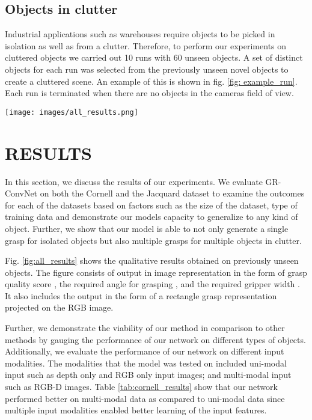 \documentclass[letterpaper, 10pt, conference]{IEEEtran}
\begin{document}
\subsection{Objects in clutter}
Industrial applications such as warehouses require objects to be picked in isolation as well as from a clutter. Therefore, to perform our experiments on cluttered objects we carried out 10 runs with 60 unseen objects. A set of distinct objects for each run was selected from the previously unseen novel objects to create a cluttered scene. An example of this is shown in fig. \ref{fig: example_run}. Each run is terminated when there are no objects in the camera\textquotesingle s field of view. 



\begin{figure*}
    \centering
    \texttt{[image: images/all\_results.png]}  
    \caption{Qualitative results. Quality, angle and width are the output of GR-ConNet which are used to infer grasp rectangle. (a) Unseen objects from Cornell dataset (b) Unseen objects from Jacquard dataset (c) Single household object (d) Multiple grasps for multiple objects (e) Poor grasp for transparent object}
    \label{fig:all_results}
\end{figure*}

\section{RESULTS} \label{results}
In this section, we discuss the results of our experiments. We evaluate GR-ConvNet on both the Cornell and the Jacquard dataset to examine the outcomes for each of the datasets based on factors such as the size of the dataset, type of training data and demonstrate our model\textquotesingle s capacity to generalize to any kind of object. Further, we show that our model is able to not only generate a single grasp for isolated objects but also multiple grasps for multiple objects in clutter.

Fig. \ref{fig:all_results} shows the qualitative results obtained on previously unseen objects. The figure consists of output in image representation  in the form of grasp quality score , the required angle for grasping , and the required gripper width . It also includes the output in the form of a rectangle grasp representation projected on the RGB image.



Further, we demonstrate the viability of our method in comparison to other methods by gauging the performance of our network on different types of objects. Additionally, we evaluate the performance of our network on different input modalities. The modalities that the model was tested on included uni-modal input such as depth only and RGB only input images; and multi-modal input such as RGB-D images. Table \ref{tab:cornell_results} show that our network performed better on multi-modal data as compared to uni-modal data since multiple input modalities enabled better learning of the input features.
\end{document}
